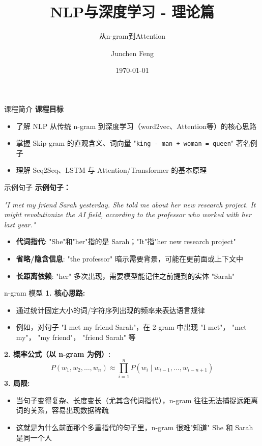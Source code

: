 \documentclass{beamer}
\title{NLP与深度学习 - 理论篇}
\subtitle{从n-gram到Attention}
\author{Junchen Feng}
\institute{Generation AI}
\date{\today}
\begin{document}
\begin{frame}
  \titlepage
\end{frame}

\begin{frame}{课程简介}
  \textbf{课程目标}  
  \begin{itemize}[<+->]
    \item 了解 NLP 从传统 n-gram 到深度学习（word2vec、Attention等）的核心思路
    \item 掌握 Skip-gram 的直观含义、词向量 "\texttt{king - man + woman = queen}" 著名例子
    \item 理解 Seq2Seq、LSTM 与 Attention/Transformer 的基本原理
  \end{itemize}
  \vspace{1em}
  
\end{frame}

\begin{frame}{示例句子}
  \textbf{示例句子：}
  \begin{block}{}
  \emph{\small
    "I met my friend Sarah yesterday. She told me about her new research project. It might revolutionize the AI field, according to the professor who worked with her last year."
  }
  \end{block}
  \vspace{1em}
  \begin{itemize}[<+->]
    \item \textbf{代词指代}: "She"和"her"指的是 Sarah；"It"指"her new research project"
    \item \textbf{省略/隐含信息}: "the professor" 暗示需要背景，可能在更前面或上下文中
    \item \textbf{长距离依赖}: "her" 多次出现，需要模型能记住之前提到的实体 "Sarah"
  \end{itemize}
\end{frame}

\begin{frame}{n-gram 模型}
  \textbf{1. 核心思路:}
  \begin{itemize}[<+->]
    \item 通过统计固定大小的词/字符序列出现的频率来表达语言规律
    \item 例如，对句子 "I met my friend Sarah"，在 2-gram 中出现 "I met"， "met my"， "my friend"， "friend Sarah" 等
  \end{itemize}
  \vspace{1em}
  \textbf{2. 概率公式（以 n-gram 为例）:}
  \[
  P(w_1, w_2, \ldots, w_n) \approx \prod_{i=1}^{n} P(w_i \mid w_{i-1}, \ldots, w_{i-n+1})
  \]
  \vspace{1em}
  \textbf{3. 局限:}
  \begin{itemize}[<+->]
    \item 当句子变得复杂、长度变长（尤其含代词指代），n-gram 往往无法捕捉远距离词的关系，容易出现数据稀疏
    \item 这就是为什么前面那个多重指代的句子里，n-gram 很难"知道" She 和 Sarah 是同一个人
  \end{itemize}
\end{frame}
\end{document}
